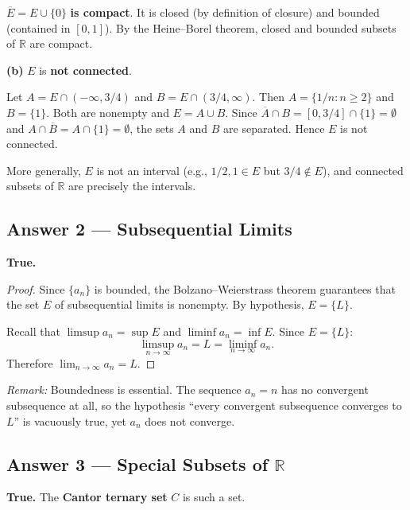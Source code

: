 \documentclass[10pt]{article}
\newcommand{\R}{\mathbb{R}}
\begin{document}
$\overline{E} = E \cup \{0\}$ \textbf{is compact}. It is closed (by definition of closure) and bounded (contained in $[0,1]$). By the Heine--Borel theorem, closed and bounded subsets of $\R$ are compact.

\medskip

\textbf{(b)} $E$ is \textbf{not connected}.

Let $A = E \cap (-\infty, 3/4)$ and $B = E \cap (3/4, \infty)$. Then $A = \{1/n : n \geq 2\}$ and $B = \{1\}$. Both are nonempty and $E = A \cup B$. Since $\overline{A} \cap B = [0, 3/4] \cap \{1\} = \emptyset$ and $A \cap \overline{B} = A \cap \{1\} = \emptyset$, the sets $A$ and $B$ are separated. Hence $E$ is not connected.

More generally, $E$ is not an interval (e.g., $1/2, 1 \in E$ but $3/4 \notin E$), and connected subsets of $\R$ are precisely the intervals.

\subsection{Answer 2 --- Subsequential Limits}

\textbf{True.}

\begin{proof}
Since $\{a_n\}$ is bounded, the Bolzano--Weierstrass theorem guarantees that the set $E$ of subsequential limits is nonempty. By hypothesis, $E = \{L\}$.

Recall that $\limsup a_n = \sup E$ and $\liminf a_n = \inf E$. Since $E = \{L\}$:
$$
\limsup_{n \to \infty} a_n = L = \liminf_{n \to \infty} a_n.
$$
Therefore $\lim_{n \to \infty} a_n = L$.
\end{proof}

\textit{Remark:} Boundedness is essential. The sequence $a_n = n$ has no convergent subsequence at all, so the hypothesis ``every convergent subsequence converges to $L$'' is vacuously true, yet $a_n$ does not converge.

\subsection{Answer 3 --- Special Subsets of $\R$}

\textbf{True.} The \textbf{Cantor ternary set} $C$ is such a set.
\end{document}
